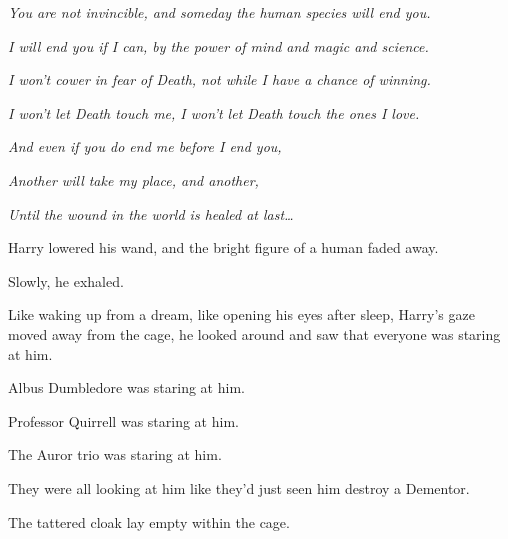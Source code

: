 \emph{You are not invincible, and someday the human species will end you.}

\emph{I will end you if I can, by the power of mind and magic and science.}

\emph{I won't cower in fear of Death, not while I have a chance of winning.}

\emph{I won't let Death touch me, I won't let Death touch the ones I love.}

\emph{And even if you do end me before I end you,}

\emph{Another will take my place, and another,}

\emph{Until the wound in the world is healed at last{\ldots}}

Harry lowered his wand, and the bright figure of a human faded away.

Slowly, he exhaled.

Like waking up from a dream, like opening his eyes after sleep, Harry's gaze 
moved away from the cage, he looked around and saw that everyone was staring at 
him.

Albus Dumbledore was staring at him.

Professor Quirrell was staring at him.

The Auror trio was staring at him.

They were all looking at him like they'd just seen him destroy a Dementor.

The tattered cloak lay empty within the cage.